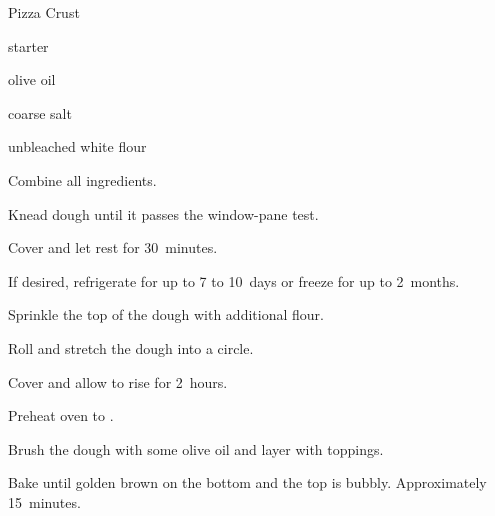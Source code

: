 \begin{recipe}{Pizza Crust}{}{}

\begin{ingredients}
\item {} starter
\item {} olive oil
\item {} coarse salt
\item {} unbleached white flour
\end{ingredients}

\begin{directions}
\item Combine all ingredients.
\item Knead dough until it passes the window-pane test.
\item Cover and let rest for 30~minutes.
\item If desired, refrigerate for up to 7 to 10~days or freeze for up to 2~months.
\item Sprinkle the top of the dough with additional flour.
\item Roll and stretch the dough into a circle.
\item Cover and allow to rise for 2~hours.
\item Preheat oven to .
\item Brush the dough with some olive oil and layer with toppings.
\item Bake until golden brown on the bottom and the top is bubbly. Approximately 15~minutes.
\end{directions}
\end{recipe}
